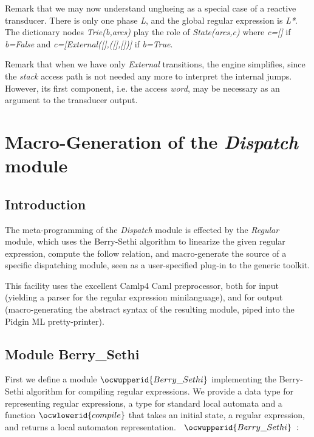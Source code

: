 \documentclass[12pt]{article}
\begin{document}
Remark that we may now understand unglueing as a special case of
a reactive transducer. There is only one phase {\sl L}, and the global regular
expression is {\sl L*}. The dictionary nodes {\sl Trie(b,arcs)} play the 
role of {\sl State(arcs,c)} where {\sl c=[]} if {\sl b=False} and
{\sl c=[External([],([],[])]} if {\sl b=True}.

Remark that when we have only {\sl External} transitions, the engine simplifies,
since the {\sl stack} access path is not needed any more to interpret
the internal jumps. However, its first component, i.e. the access {\sl word},
may be necessary as an argument to the transducer output. 

\section{Macro-Generation of the {\it Dispatch} module}
\label{macro}

\subsection{Introduction} 

The meta-programming of the {\it Dispatch} module is effected by the 
{\sl Regular} module, which uses the Berry-Sethi algorithm to linearize the 
given regular expression, compute the follow relation, and macro-generate the 
source of a specific dispatching module,
seen as a user-specified plug-in to the generic toolkit. 

This facility uses the excellent Camlp4 Caml preprocessor, 
both for input (yielding a parser
for the regular expression minilanguage), and for output 
(macro-generating the abstract syntax
of the resulting module, piped into the Pidgin ML pretty-printer). 

\label{../ML/regular.ml:0}%
\subsection {Module Berry\_Sethi} 
\ocweol
\ocwindent{0.00em}
First we define a module \ocwbegindcode{}$\ocwupperid{Berry\_Sethi}$\ocwenddcode{} implementing the Berry-Sethi 
   algorithm for compiling regular expressions. We provide a data 
   type for representing regular expressions, a type for standard local 
   automata and a function \ocwbegindcode{}$\ocwlowerid{compile}$\ocwenddcode{} that takes an initial state, a regular 
   expression, and returns a local automaton representation. 
\ocweol
\label{../ML/regular.ml:1222}%
\medskip
\ocwbegincode{}\ocwindent{0.00em}
~$\ocwupperid{Berry\_Sethi}~:~$\medskip
\end{document}
